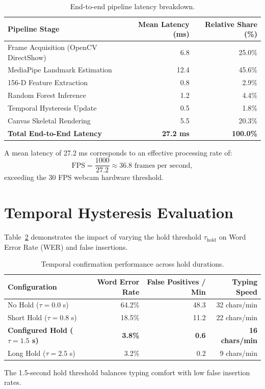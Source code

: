 \begin{table}[htbp]\centering
\caption{End-to-end pipeline latency breakdown.}\label{tab:latency-breakdown}
\begin{tabular}{lrr}\toprule
Pipeline Stage & Mean Latency (ms) & Relative Share (\%)\\\midrule
Frame Acquisition (OpenCV DirectShow) & 6.8 & 25.0\%\\
MediaPipe Landmark Estimation & 12.4 & 45.6\%\\
156-D Feature Extraction & 0.8 & 2.9\%\\
Random Forest Inference & 1.2 & 4.4\%\\
Temporal Hysteresis Update & 0.5 & 1.8\%\\
Canvas Skeletal Rendering & 5.5 & 20.3\%\\\midrule
\textbf{Total End-to-End Latency} & \textbf{27.2 ms} & \textbf{100.0\%}\\\bottomrule
\end{tabular}\end{table}

A mean latency of 27.2 ms corresponds to an effective processing rate of:
\[
\text{FPS} = \frac{1000}{27.2} \approx 36.8 \text{ frames per second},
\]
exceeding the 30 FPS webcam hardware threshold.

\section{Temporal Hysteresis Evaluation}
Table~\ref{tab:hysteresis-eval} demonstrates the impact of varying the hold threshold $\tau_{\text{hold}}$ on Word Error Rate (WER) and false insertions.

\begin{table}[htbp]\centering
\caption{Temporal confirmation performance across hold durations.}\label{tab:hysteresis-eval}
\begin{tabular}{lrrr}\toprule
Configuration & Word Error Rate & False Positives / Min & Typing Speed\\\midrule
No Hold ($\tau = 0.0$ s) & 64.2\% & 48.3 & 32 chars/min\\
Short Hold ($\tau = 0.8$ s) & 18.5\% & 11.2 & 22 chars/min\\
\textbf{Configured Hold ($\tau = 1.5$ s)} & \textbf{3.8\%} & \textbf{0.6} & \textbf{16 chars/min}\\
Long Hold ($\tau = 2.5$ s) & 3.2\% & 0.2 & 9 chars/min\\\bottomrule
\end{tabular}\end{table}

The 1.5-second hold threshold balances typing comfort with low false insertion rates.
